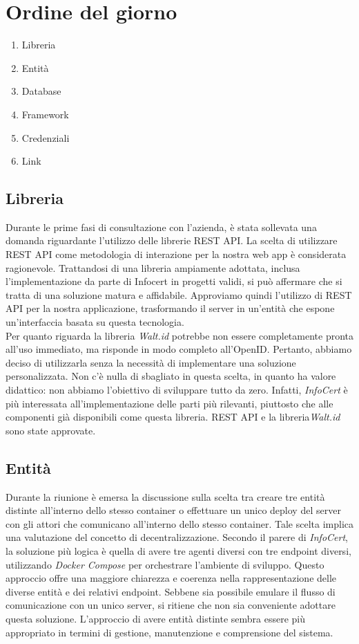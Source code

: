 \section{Ordine del giorno}
\begin{enumerate}
\item Libreria
\item Entità
\item Database
\item Framework 
\item Credenziali
\item Link
\end{enumerate}

\subsection{Libreria}
Durante le prime fasi di consultazione con l'azienda, è stata sollevata una domanda riguardante l'utilizzo delle librerie REST API. 
La scelta di utilizzare REST API come metodologia di interazione per la nostra web app è considerata ragionevole. 
Trattandosi di una libreria ampiamente adottata, inclusa l'implementazione da parte di Infocert in progetti validi, si può affermare che si tratta di 
una soluzione matura e affidabile. Approviamo quindi l'utilizzo di REST API per la nostra applicazione, trasformando il server in un'entità che espone 
un'interfaccia basata su questa tecnologia. \\Per quanto riguarda la libreria \textit{Walt.id} potrebbe non essere completamente pronta all'uso immediato, 
ma risponde in modo completo all'OpenID. Pertanto, abbiamo deciso di utilizzarla senza la necessità di implementare una soluzione personalizzata. 
Non c'è nulla di sbagliato in questa scelta, in quanto ha valore didattico: non abbiamo l'obiettivo di sviluppare tutto da zero. 
Infatti, \textit{InfoCert} è più interessata all'implementazione delle parti più rilevanti, piuttosto che alle componenti già disponibili come questa libreria.
REST API e  la libreria\textit{Walt.id} sono state approvate.

\subsection{Entità}
Durante la riunione è emersa la discussione sulla scelta tra creare tre entità distinte all'interno dello stesso container o effettuare un unico deploy 
del server con gli attori che comunicano all'interno dello stesso container. Tale scelta implica una valutazione del concetto di decentralizzazione.
Secondo il parere di \textit{InfoCert}, la soluzione più logica è quella di avere tre agenti diversi con tre endpoint diversi, 
utilizzando \textit{Docker Compose} per orchestrare l'ambiente di sviluppo. Questo approccio offre una maggiore chiarezza e coerenza nella rappresentazione 
delle diverse entità e dei relativi endpoint. Sebbene sia possibile emulare il flusso di comunicazione con un unico server, 
si ritiene che non sia conveniente adottare questa soluzione. L'approccio di avere entità distinte sembra essere più appropriato in termini di gestione, 
manutenzione e comprensione del sistema.

